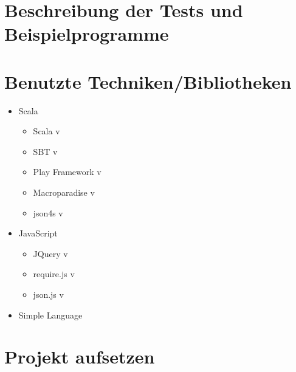 \documentclass[12pt,a4paper]{report}
\begin{document}
\begin{acronym}[TU-Berlin]
 \acro{}{}
 \acro{}{}
\end{acronym}


\section{Beschreibung der Tests und Beispielprogramme}


\section{Benutzte Techniken/Bibliotheken}

\begin{itemize}
  \item{Scala}
  \begin{itemize}
    \item{Scala v}
    \item{SBT v}
    \item{Play Framework v}
    \item{Macroparadise v}
    \item{json4s v}
  \end{itemize}
  \item{JavaScript}
  \begin{itemize}
    \item{JQuery v}
    \item{require.js v}
    \item{json.js v}
  \end{itemize}
  \item{Simple Language}
\end{itemize}



\section{Projekt aufsetzen}
\end{document}
